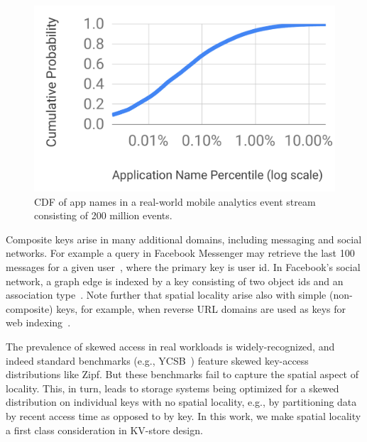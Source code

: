 \begin{figure}[tb]
\centering
\includegraphics[width=0.75\columnwidth]{figs/cdf.pdf}
\caption{CDF of app names in a real-world mobile analytics event stream consisting of 200 million events.}
\label{fig:cdf}
\end{figure}

Composite keys arise in many additional domains, including messaging and social networks. 
For example a query in Facebook Messenger may retrieve the last 100 messages for a 
given user~\cite{Borthakur:2011:AHG:1989323.1989438}, where the primary key is user id. 
In Facebook's social network, a graph edge is indexed by a key consisting of two 
object ids and an association type~\cite{Armstrong:2013:LDB:2463676.2465296}.
Note further that spatial locality  arise also with simple (non-composite) keys, for example, when 
reverse  URL domains are used as keys for web  indexing~\cite{Cho:1998:ECT:297805.297835}. 

The prevalence of skewed  access  in real workloads is widely-recognized, 
and indeed standard benchmarks (e.g., YCSB~\cite{YCSB})  feature skewed key-access distributions like Zipf.
But 
these benchmarks fail to capture the spatial aspect of locality.
This, in turn, leads to storage systems being optimized for a skewed distribution on individual keys with no spatial locality,
e.g., by partitioning data by recent access time as opposed to by key.
In this work, we make spatial locality a first class consideration in KV-store design.

